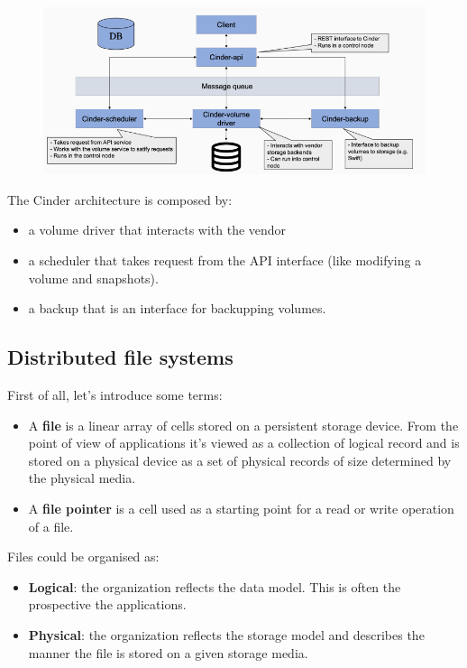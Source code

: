     \begin{figure}[h!]
        \centering
        \includegraphics[scale=0.5]{images/Cinder architecture.png}
    \end{figure}
    
    The Cinder architecture is composed by:
    \begin{itemize}
        \item a volume driver that interacts with the vendor
        \item a scheduler that takes request from the API interface (like modifying a volume and snapshots).
        \item a backup that is an interface for backupping volumes.
    \end{itemize}


\subsection{Distributed file systems}
First of all, let's introduce some terms:
\begin{itemize}
    \item A \textbf{file} is a linear array of cells stored on a persistent storage device. From the point of view of applications it's viewed as a collection of logical record and is stored on a physical device as a set of physical records of size determined by the physical media.
    \item A \textbf{file pointer} is a cell used as a starting point for a read or write operation of a file.
\end{itemize}
Files could be organised as:
\begin{itemize}
    \item \textbf{Logical}: the organization reflects the data model. This is often the prospective the applications.
    \item \textbf{Physical}: the organization reflects the storage model and describes the manner the file is stored on a given storage media.
\end{itemize}

